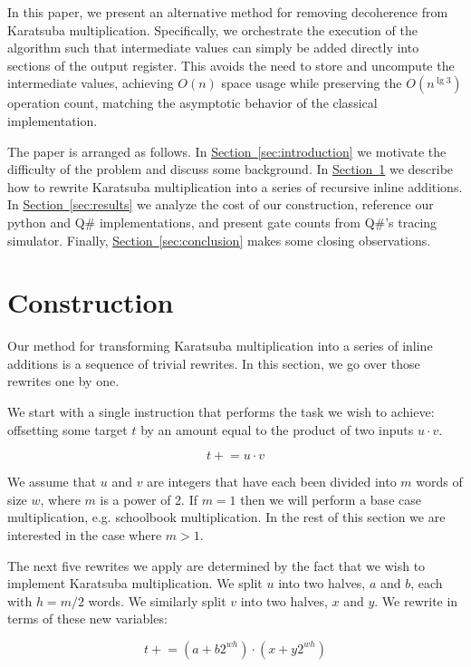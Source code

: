 \documentclass[onecolumn]{quantumarticle}
\renewcommand{\sec}[1]{\hyperref[sec:#1]{Section~\ref*{sec:#1}}}
\begin{document}
In this paper, we present an alternative method for removing decoherence from Karatsuba multiplication.
Specifically, we orchestrate the execution of the algorithm such that intermediate values can simply be added directly into sections of the output register.
This avoids the need to store and uncompute the intermediate values, achieving $O(n)$ space usage while preserving the $O(n^{\lg 3})$ operation count, matching the asymptotic behavior of the classical implementation.

The paper is arranged as follows.
In \sec{introduction} we motivate the difficulty of the problem and discuss some background.
In \sec{methods} we describe how to rewrite Karatsuba multiplication into a series of recursive inline additions.
In \sec{results} we analyze the cost of our construction, reference our python and Q\# implementations, and present gate counts from Q\#'s tracing simulator.
Finally, \sec{conclusion} makes some closing observations.

\section{Construction}
\label{sec:methods}

\newcommand{\pluseq}{\mathrel{+}=}
\newcommand{\minuseq}{\mathrel{-}=}
\newcommand{\timeseq}{\mathrel{\ast}=}

Our method for transforming Karatsuba multiplication into a series of inline additions is a sequence of trivial rewrites.
In this section, we go over those rewrites one by one.

We start with a single instruction that performs the task we wish to achieve: offsetting some target $t$ by an amount equal to the product of two inputs $u \cdot v$.

$$t \pluseq u \cdot v$$

We assume that $u$ and $v$ are integers that have each been divided into $m$ words of size $w$, where $m$ is a power of 2.
If $m=1$ then we will perform a base case multiplication, e.g. schoolbook multiplication.
In the rest of this section we are interested in the case where $m>1$.

The next five rewrites we apply are determined by the fact that we wish to implement Karatsuba multiplication.
We split $u$ into two halves, $a$ and $b$, each with $h=m/2$ words.
We similarly split $v$ into two halves, $x$ and $y$.
We rewrite in terms of these new variables:

$$t \pluseq (a + b 2^{wh}) \cdot (x + y 2^{wh})$$
\end{document}
